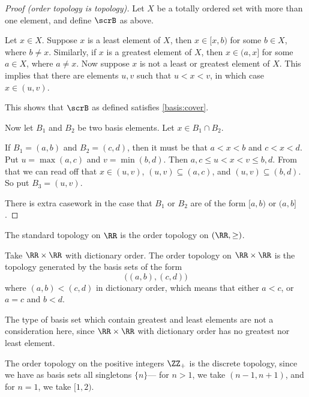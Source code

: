 \documentclass{article}
\begin{document}
\begin{proof}[Proof (order topology is topology)]
    Let $X$ be a totally ordered set with more than one element, and define $\scrB$ as above.

    Let $x \in X$.
    Suppose $x$ is a least element of $X$, then $x \in [x,b)$ for some $b \in X$, where $b \neq x$.
    Similarly, if $x$ is a greatest element of $X$, then $x \in (a, x]$ for some $a \in X$, where $a \neq x$.
    Now suppose $x$ is not a least or greatest element of $X$.
    This implies that there are elements $u,v$ such that $u < x < v$, in which case $x \in (u,v)$.

    This shows that $\scrB$ as defined satisfies \ref{basis:cover}.

    Now let $B_1$ and $B_2$ be two basis elements.
    Let $x \in B_1 \cap B_2$.

    If $B_1 = (a,b)$ and $B_2 = (c,d)$, then it must be that $a<x<b$ and $c<x<d$.
    Put $u = \max(a,c)$ and $v = \min(b,d)$.
    Then $a,c \leq u < x < v \leq b,d$. 
    From that we can read off that $x \in (u,v)$, $(u,v) \subseteq (a,c)$, and $(u,v) \subseteq (b,d)$.
    So put $B_3 = (u,v)$.

    There is extra casework in the case that $B_1$ or $B_2$ are of the form $[a, b)$ or $(a, b]$.

\end{proof}

\begin{example}
    The standard topology on $\RR$ is the order topology on $(\RR, \geq)$.
\end{example}

\begin{example}
    Take $\RR \times \RR$ with dictionary order.
    The order topology on $\RR \times \RR$ is the topology generated by the basis sets of the form 
    \[
        \Big((a,b), (c,d)\Big)
    \]
    where $(a,b) < (c,d)$ in dictionary order, which means that either $a<c$, or $a=c$ and $b<d$.

    The type of basis set which contain greatest and least elements are not a consideration here, since $\RR \times \RR$ with dictionary order has no greatest nor least element.
\end{example}

\begin{example}
    The order topology on the positive integers $\ZZ_+$ is the discrete topology, since we have as basis sets all singletons $\{n\}$---
    for $n > 1$, we take $(n-1,n+1)$, and for $n=1$, we take $[1,2)$.
\end{example}
\end{document}
